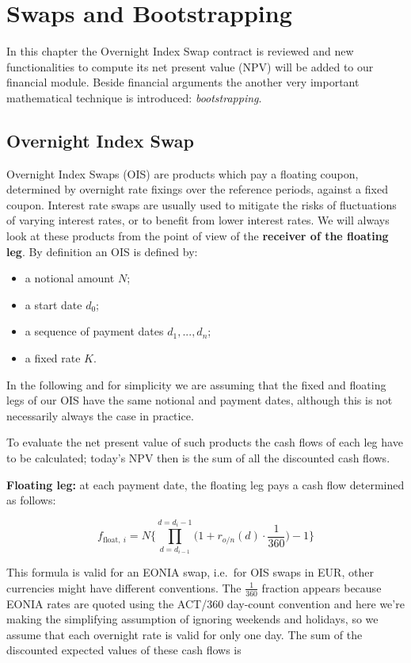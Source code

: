 \chapter{Swaps and Bootstrapping}\label{swaps-and-bootstrapping---practical-lesson-5}

In this chapter the Overnight Index Swap contract is reviewed and new functionalities to compute its net present value (NPV) will be added to our financial module. Beside financial arguments the another very important mathematical technique is introduced: \emph{bootstrapping}.

\section{Overnight Index Swap}\label{overnight-index-swap}

Overnight Index Swaps (OIS) are products which pay a floating coupon, determined by overnight rate fixings over the reference periods, against a fixed coupon. Interest rate swaps are usually used to mitigate the risks of fluctuations of varying interest rates, or to benefit from  lower interest rates. We will always look at these products from the point of view of the \textbf{receiver of the floating leg}. By definition an OIS is defined by:

\begin{itemize}
\tightlist
\item a notional amount \(N\);
\item a start date \(d_0\);
\item a sequence of payment dates \(d_1,...,d_n\);
\item a fixed rate \(K\).
\end{itemize}

In the following and for simplicity we are assuming that the fixed and floating legs of our OIS have the same notional and payment dates, although this is not necessarily always the case in practice.

To evaluate the net present value of such products the cash flows of each leg have to be calculated; today's NPV then is the sum of all the discounted cash flows.

\textbf{Floating leg:} at each payment date, the floating leg pays a cash flow determined as follows:

\[f_{\mathrm{float},~i} = N \Bigg\{\prod_{d=d_{i-1}}^{d=d_i-1}\Big(1+r_{o/n}(d)\cdot\frac{1}{360}\Big) -1 \Bigg\}\]

This formula is valid for an EONIA swap, i.e.~for OIS swaps in EUR, other currencies might have different conventions. The \(\frac{1}{360}\) fraction appears because EONIA rates are quoted using the ACT/360 day-count convention and here we're making the simplifying assumption of ignoring weekends and holidays, so we assume that each overnight rate is valid for only one day.
The sum of the discounted expected values of these cash flows is

